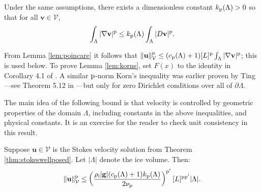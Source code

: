 \documentclass[hidelinks,onefignum,onetabnum,final]{siamart220329}  %
\newcommand{\grad}{\nabla}
\newcommand{\bg}{\mathbf{g}}
\newcommand{\bu}{\mathbf{u}}
\newcommand{\bv}{\mathbf{v}}
\newcommand{\cV}{\mathcal{V}}
\newcommand{\pp}{{\text{\textnormal{p}}}}
\newcommand{\rhoi}{\rho_{\text{i}}}
\begin{document}
\begin{lemma} \label{lem:korns}
Under the same assumptions, there exists a dimensionless constant $k_{\pp}(\Lambda)>0$ so that for all $\bv \in \cV$,
\begin{equation}
\int_\Lambda |\grad\bv|^\pp \le k_{\pp}(\Lambda) \int_\Lambda |D\bv|^\pp. \label{eq:korns}
\end{equation}
\end{lemma}

From Lemma \ref{lem:poincare} it follows that $\|\bu\|_{\cV}^\pp \le (c_{\pp}(\Lambda) + 1) [L]^\pp \int_\Lambda |\grad\bv|^\pp$; this is used below.  To prove Lemma \ref{lem:korns}, set $F(x)$ to the identity in Corollary 4.1 of \cite{Pompe2003}.  A similar $\pp$-norm Korn's inequality was earlier proven by Ting \cite{Ting1972}---see Theorem 5.12 in \cite{KikuchiOden1988}---but only for zero Dirichlet conditions over all of $\partial \Lambda$.

The main idea of the following bound is that velocity is controlled by geometric properties of the domain $\Lambda$, including constants in the above inequalities, and physical constants.  It is an exercise for the reader to check unit consistency in this result.

\begin{lemma} \label{lem:stokesapriori}
Suppose $\bu\in\cV$ is the Stokes velocity solution from Theorem \ref{thm:stokeswellposed}.  Let $|\Lambda|$ denote the ice volume.  Then:
\begin{equation}
\|\bu\|_{\cV}^\pp \le \left(\frac{\rhoi |\bg| (c_{\pp}(\Lambda) + 1) k_{\pp}(\Lambda)}{2 \nu_\pp}\right)^{\pp'} [L]^{\pp\pp'} |\Lambda|. \label{eq:stokesapriori}
\end{equation}

\end{lemma}
\end{document}
